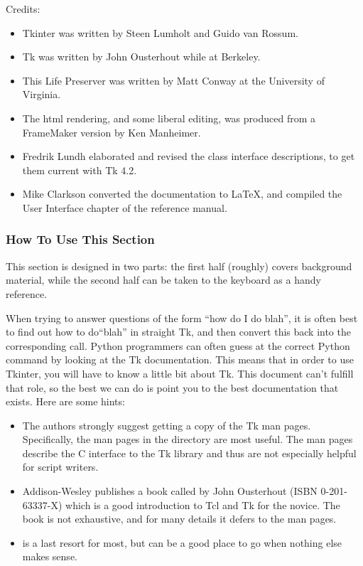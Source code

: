 Credits:
\begin{itemize}
\item   Tkinter was written by Steen Lumholt and Guido van Rossum.
\item   Tk was written by John Ousterhout while at Berkeley.
\item   This Life Preserver was written by Matt Conway at
the University of Virginia.
\item   The html rendering, and some liberal editing, was
produced from a FrameMaker version by Ken Manheimer.
\item   Fredrik Lundh elaborated and revised the class interface descriptions,
to get them current with Tk 4.2.
\item  Mike Clarkson converted the documentation to \LaTeX, and compiled the 
User Interface chapter of the reference manual.
\end{itemize}


\subsubsection{How To Use This Section}

This section is designed in two parts: the first half (roughly) covers
background material, while the second half can be taken to the
keyboard as a handy reference.

When trying to answer questions of the form ``how do I do blah'', it
is often best to find out how to do``blah'' in straight Tk, and then
convert this back into the corresponding  call.
Python programmers can often guess at the correct Python command by
looking at the Tk documentation. This means that in order to use
Tkinter, you will have to know a little bit about Tk. This document
can't fulfill that role, so the best we can do is point you to the
best documentation that exists. Here are some hints:

\begin{itemize}
\item   The authors strongly suggest getting a copy of the Tk man
pages. Specifically, the man pages in the  directory are most
useful. The  man pages describe the C interface to the Tk
library and thus are not especially helpful for script writers.  

\item   Addison-Wesley publishes a book called  by John Ousterhout (ISBN 0-201-63337-X) which is a good
introduction to Tcl and Tk for the novice.  The book is not
exhaustive, and for many details it defers to the man pages. 

\item   {} is a last resort for most, but can be a good
place to go when nothing else makes sense.  
\end{itemize}

